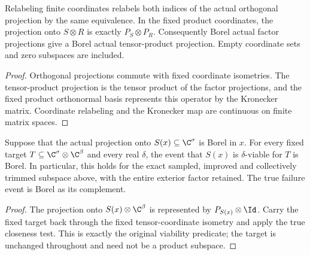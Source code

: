 \begin{lemma}
    \label{lem:borel_actual_tensor_projection_coordinates}
    \leanok
    Relabeling finite coordinates relabels both indices of the actual
    orthogonal projection by the same equivalence. In the fixed product
    coordinates, the projection onto $S\otimes R$ is exactly
    $P_S\otimes P_R$. Consequently Borel actual factor projections give
    a Borel actual tensor-product projection. Empty coordinate sets and
    zero subspaces are included.
\end{lemma}
\begin{proof}\leanok
    Orthogonal projections commute with fixed coordinate isometries.
    The tensor-product projection is the tensor product of the factor
    projections, and the fixed product orthonormal basis represents this
    operator by the Kronecker matrix. Coordinate relabeling and the
    Kronecker map are continuous on finite matrix spaces.
\end{proof}

\begin{lemma}
    \label{lem:borel_true_regional_viability_event}
    \leanok
    Suppose that the actual projection onto $S(x)\subseteq\C^\sigma$ is
    Borel in $x$. For every fixed target
    $T\subseteq\C^\sigma\otimes\C^\beta$ and every real $\delta$, the
    event that $S(x)$ is $\delta$-viable for $T$ is Borel. In particular,
    this holds for the exact sampled, improved and collectively trimmed
    subspace above, with the entire exterior factor retained. The true
    failure event is Borel as its complement.
\end{lemma}
\begin{proof}\leanok
    The projection onto $S(x)\otimes\C^\beta$ is represented by
    $P_{S(x)}\otimes\Id$. Carry the fixed target back through the fixed
    tensor-coordinate isometry and apply the true closeness test. This
    is exactly the original viability predicate; the target is unchanged
    throughout and need not be a product subspace.
\end{proof}

